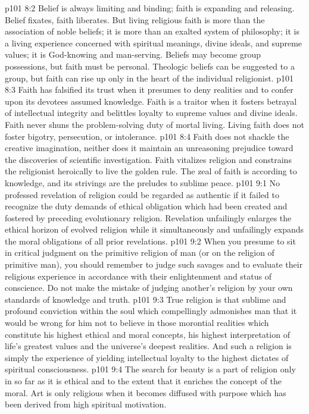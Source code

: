 \vs p101 8:2 Belief is always limiting and binding; faith is expanding and releasing. Belief fixates, faith liberates. But living religious faith is more than the association of noble beliefs; it is more than an exalted system of philosophy; it is a living experience concerned with spiritual meanings, divine ideals, and supreme values; it is God\hyp{}knowing and man\hyp{}serving. Beliefs may become group possessions, but faith must be personal. Theologic beliefs can be suggested to a group, but faith can rise up only in the heart of the individual religionist.
\vs p101 8:3 Faith has falsified its trust when it presumes to deny realities and to confer upon its devotees assumed knowledge. Faith is a traitor when it fosters betrayal of intellectual integrity and belittles loyalty to supreme values and divine ideals. Faith never shuns the problem\hyp{}solving duty of mortal living. Living faith does not foster bigotry, persecution, or intolerance.
\vs p101 8:4 Faith does not shackle the creative imagination, neither does it maintain an unreasoning prejudice toward the discoveries of scientific investigation. Faith vitalizes religion and constrains the religionist heroically to live the golden rule. The zeal of faith is according to knowledge, and its strivings are the preludes to sublime peace.
\vs p101 9:1 No professed revelation of religion could be regarded as authentic if it failed to recognize the duty demands of ethical obligation which had been created and fostered by preceding evolutionary religion. Revelation unfailingly enlarges the ethical horizon of evolved religion while it simultaneously and unfailingly expands the moral obligations of all prior revelations.
\vs p101 9:2 When you presume to sit in critical judgment on the primitive religion of man (or on the religion of primitive man), you should remember to judge such savages and to evaluate their religious experience in accordance with their enlightenment and status of conscience. Do not make the mistake of judging another’s religion by your own standards of knowledge and truth.
\vs p101 9:3 True religion is that sublime and profound conviction within the soul which compellingly admonishes man that it would be wrong for him not to believe in those morontial realities which constitute his highest ethical and moral concepts, his highest interpretation of life’s greatest values and the universe’s deepest realities. And such a religion is simply the experience of yielding intellectual loyalty to the highest dictates of spiritual consciousness.
\vs p101 9:4 The search for beauty is a part of religion only in so far as it is ethical and to the extent that it enriches the concept of the moral. Art is only religious when it becomes diffused with purpose which has been derived from high spiritual motivation.

